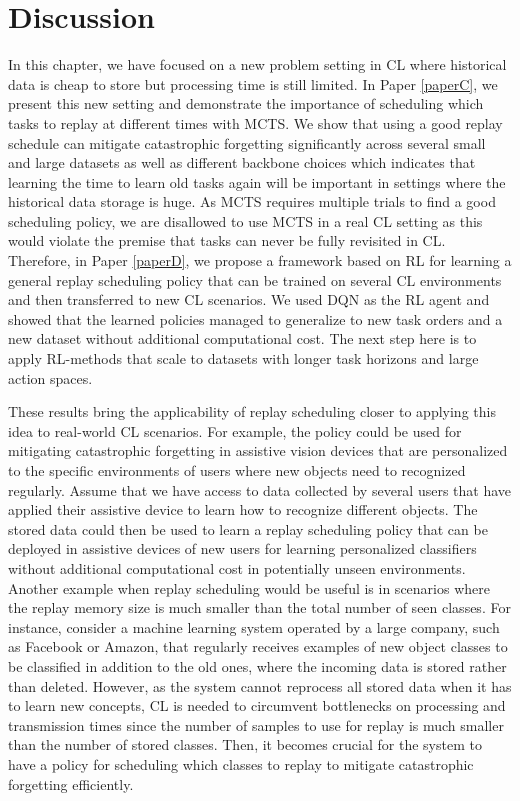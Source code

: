 \section{Discussion}

In this chapter, we have focused on a new problem setting in CL where historical data is cheap to store but processing time is still limited. In Paper \ref{paperC}, we present this new setting and demonstrate the importance of scheduling which tasks to replay at different times with MCTS. We show that using a good replay schedule can mitigate catastrophic forgetting significantly across several small and large datasets as well as different backbone choices which indicates that learning the time to learn old tasks again will be important in settings where the historical data storage is huge. As MCTS requires multiple trials to find a good scheduling policy, we are disallowed to use MCTS in a real CL setting as this would violate the premise that tasks can never be fully revisited in CL. Therefore, in Paper \ref{paperD}, we propose a framework based on RL for learning a general replay scheduling policy that can be trained on several CL environments and then transferred to new CL scenarios. We used DQN as the RL agent and showed that the learned policies managed to generalize to new task orders and a new dataset without additional computational cost. The next step here is to apply RL-methods that scale to datasets with longer task horizons and large action spaces. 

These results bring the applicability of replay scheduling closer to applying this idea to real-world CL scenarios. For example, the policy could be used for mitigating catastrophic forgetting in assistive vision devices that are personalized to the specific environments of users where new objects need to recognized regularly. Assume that we have access to data collected by several users that have applied their assistive device to learn how to recognize different objects. The stored data could then be used to learn a replay scheduling policy that can be deployed in assistive devices of new users for learning personalized classifiers without additional computational cost in potentially unseen environments. Another example when replay scheduling would be useful is in scenarios where the replay memory size is much smaller than the total number of seen classes. For instance, consider a machine learning system operated by a large company, such as Facebook or Amazon, that regularly receives examples of new object classes to be classified in addition to the old ones, where the incoming data is stored rather than deleted. However, as the system cannot reprocess all stored data when it has to learn new concepts, CL is needed to circumvent bottlenecks on processing and transmission times since the number of samples to use for replay is much smaller than the number of stored classes. Then, it becomes crucial for the system to have a policy for scheduling which classes to replay to mitigate catastrophic forgetting efficiently.

